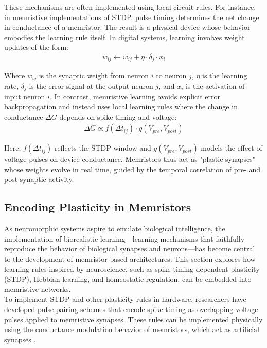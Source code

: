 \noindent These mechanisms are often implemented using local circuit rules. For instance, in memristive implementations of STDP, pulse timing determines the net change in conductance of a memristor. The result is a physical device whose behavior embodies the learning rule itself. In digital systems, learning involves weight updates of the form:
\begin{align}
    w_{ij} \leftarrow w_{ij} + \eta \cdot \delta_j \cdot x_i \label{eq:1.32} 
\end{align}

\noindent Where $w_{ij}$ is the synaptic weight from neuron $i$ to neuron $j$, $\eta$ is the learning rate, $\delta_j$ is the error signal at the output neuron $j$, and $x_i$ is the activation of input neuron $i$. In contrast, memristive learning avoids explicit error backpropagation and instead uses local learning rules where the change in conductance $\Delta G$ depends on spike-timing and voltage:
\begin{align}
    \Delta G \varpropto f(\Delta t_{ij}) \cdot g(V_{pre}, V_{post}) \label{eq:1.33}
\end{align}

\noindent Here, $f(\Delta t_{ij})$ reflects the STDP window and $g(V_{pre}, V_{post})$ models the effect of voltage pulses on device conductance. Memristors thus act as "plastic synapses" whose weights evolve in real time, guided by the temporal correlation of pre- and post-synaptic activity.

\subsection[Encoding Plasticity in Memristors]{Encoding Plasticity in Memristors}

As neuromorphic systems aspire to emulate biological intelligence, the implementation of biorealistic learning—learning mechanisms that faithfully reproduce the behavior of biological synapses and neurons—has become central to the development of memristor-based architectures. This section explores how learning rules inspired by neuroscience, such as spike-timing-dependent plasticity (STDP), Hebbian learning, and homeostatic regulation, can be embedded into memristive networks.\\

\noindent To implement STDP and other plasticity rules in hardware, researchers have developed pulse-pairing schemes that encode spike timing as overlapping voltage pulses applied to memristive synapses. These rules can be implemented physically using the conductance modulation behavior of memristors, which act as artificial synapses \cite{campbell2016pulse}. \\

